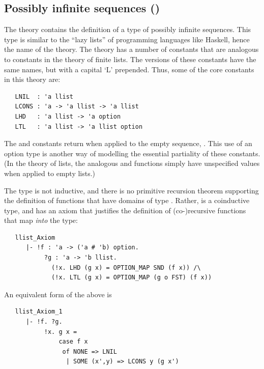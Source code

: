 {

\subsection{Possibly infinite sequences ()}


The theory  contains the definition of a type of
possibly infinite sequences.  This type is similar to the ``lazy
lists'' of programming languages like Haskell, hence the name of the
theory.  The  theory has a number of constants that
are analogous to constants in the theory of finite
lists.  The  versions of these constants have the
same names, but with a capital `L\/' prepended.  Thus, some of the core
constants in this theory are:
\begin{hol}
\begin{verbatim}
   LNIL  : 'a llist
   LCONS : 'a -> 'a llist -> 'a llist
   LHD   : 'a llist -> 'a option
   LTL   : 'a llist -> 'a llist option
\end{verbatim}
\end{hol}

The  and  constants return  when applied to
the empty sequence, .  This use of an option type is another
way of modelling the essential partiality of these constants.  (In the
theory of lists, the analogous  and  functions simply
have unspecified values when applied to empty lists.)

The type  is not inductive, and there is no primitive
recursion theorem supporting the definition of functions that have
domains of type .  Rather,  is a coinductive type,
and has an axiom that justifies the definition of (co-)recursive
functions that map \emph{into} the  type:
\begin{hol}
\begin{verbatim}
   llist_Axiom
      |- !f : 'a -> ('a # 'b) option.
           ?g : 'a -> 'b llist.
             (!x. LHD (g x) = OPTION_MAP SND (f x)) /\
             (!x. LTL (g x) = OPTION_MAP (g o FST) (f x))
\end{verbatim}
\end{hol}
\noindent An equivalent form of the above is
\begin{hol}
\begin{verbatim}
   llist_Axiom_1
      |- !f. ?g.
           !x. g x =
               case f x
                of NONE => LNIL
                 | SOME (x',y) => LCONS y (g x')
\end{verbatim}
\end{hol}

}
